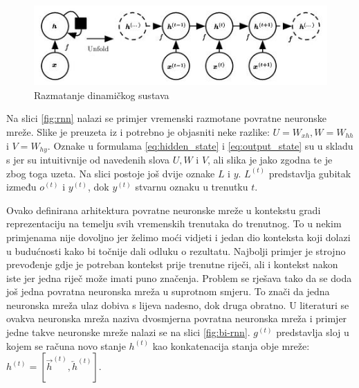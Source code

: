 \documentclass[times, utf8, diplomski]{fer}
\begin{document}
\begin{figure}
    \centering
    \includegraphics[scale=0.7]{figures/recognizer/dynamic.jpg}
    \caption[Caption for LOF]{Razmatanje dinamičkog sustava\footnotemark}
    \label{fig:dynamic}
\end{figure}

Na slici \ref{fig:rnn} nalazi se primjer vremenski razmotane povratne neuronske mreže. Slike je preuzeta iz \citep{Goodfellow-et-al-2016} i potrebno je objasniti neke razlike: $U=W_{xh}, W=W_{hh}$ i $V=W_{hy}$. Oznake u formulama \ref{eq:hidden_state} i \ref{eq:output_state} su u skladu s \citep{duboko} jer su intuitivnije od navedenih slova $U, W$ i $V$, ali slika je jako zgodna te je zbog toga uzeta. Na slici postoje još dvije oznake $L$ i $y$. $L^{(t)}$ predstavlja gubitak između $o^{(t)}$ i $y^{(t)}$, dok $y^{(t)}$ stvarnu oznaku u trenutku $t$.

Ovako definirana arhitektura povratne neuronske mreže u kontekstu gradi reprezentaciju na temelju svih vremenskih trenutaka do trenutnog. To u nekim primjenama nije dovoljno jer želimo moći vidjeti i jedan dio konteksta koji dolazi u budućnosti kako bi točnije dali odluku o rezultatu. Najbolji primjer je strojno prevođenje gdje je potreban kontekst prije trenutne riječi, ali i kontekst nakon iste jer jedna riječ može imati puno značenja. Problem se rješava tako da se doda još jedna povratna neuronska mreža u suprotnom smjeru. To znači da jedna neuronska mreža ulaz dobiva s lijeva nadesno, dok druga obratno. U literaturi se ovakva neuronska mreža naziva dvosmjerna povratna neuronska mreža  i primjer jedne takve neuronske mreže nalazi se na slici \ref{fig:bi-rnn}. $g^{(t)}$ predstavlja sloj u kojem se računa novo stanje $h^{(t)}$ kao konkatenacija stanja obje mreže: $h^{(t)} = [\overrightarrow{h}^{(t)}, \overleftarrow{h}^{(t)}]$.
\end{document}
